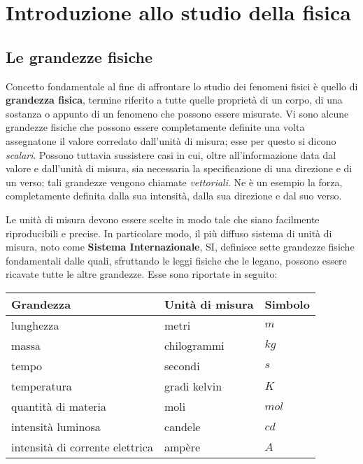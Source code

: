 \documentclass[10pt,a4paper]{book}
\begin{document}
\chapter{Introduzione allo studio della fisica}

\section{Le grandezze fisiche}

Concetto fondamentale al fine di affrontare lo studio dei fenomeni fisici è quello di \textbf{grandezza fisica}, termine riferito a tutte quelle proprietà di un corpo, di una sostanza o appunto di un fenomeno che possono essere misurate.
Vi sono alcune grandezze fisiche che possono essere completamente definite una volta assegnatone il valore corredato dall'unità di misura; esse per questo si dicono \emph{scalari}. Possono tuttavia sussistere casi in cui, oltre all'informazione data dal valore e dall'unità di misura, sia necessaria la specificazione di una direzione e di un verso; tali grandezze vengono chiamate \emph{vettoriali}. Ne è un esempio la forza, completamente definita dalla sua intensità, dalla sua direzione e dal suo verso.

Le unità di misura devono essere scelte in modo tale che siano facilmente riproducibili e precise. In particolare modo, il più diffuso sistema di unità di misura, noto come \textbf{Sistema Internazionale}, SI, definisce sette grandezze fisiche fondamentali dalle quali, sfruttando le leggi fisiche che le legano, possono essere ricavate tutte le altre grandezze. Esse sono riportate in seguito:
\begin{center}
	\begin{tabular}{lll}
	\toprule
	Grandezza & Unità di misura &Simbolo \\
	\midrule
	lunghezza & metri & $m$ \\
	massa  & chilogrammi & $kg$ \\
	tempo & secondi  & $s$\\
	temperatura &gradi kelvin & $K$\\
	quantità di materia &moli  & $mol$\\
	intensità luminosa  &candele& $cd$ \\
	intensità di corrente elettrica  &ampère & $A$ \\
	\bottomrule
	\end{tabular}
\end{center}
\end{document}
